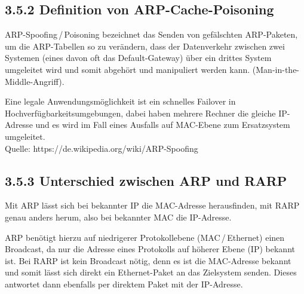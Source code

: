 \documentclass[a4paper,
			llpt,
			solution,
			accentcolor=tud2d,
			colorbacktitle
			]
			{tudexercise}
\newcommand{\8}{$\infty$}
\begin{document}
\subsection{3.5.2 Definition von ARP-Cache-Poisoning}
ARP-Spoofing\,/\,Poisoning bezeichnet das Senden von gefälschten ARP-Paketen, um die ARP-Tabellen so zu verändern, dass der Datenverkehr zwischen zwei Systemen (eines davon oft das Default-Gateway) über ein drittes System umgeleitet wird und somit abgehört und manipuliert werden kann. (Man-in-the-Middle-Angriff).

Eine legale Anwendungsmöglichkeit ist ein schnelles Failover in Hochverfügbarkeitsumgebungen, dabei haben mehrere Rechner die gleiche IP-Adresse und es wird im Fall eines Ausfalls auf MAC-Ebene zum Ersatzsystem umgeleitet.
\\
Quelle: https://de.wikipedia.org/wiki/ARP-Spoofing


\subsection{3.5.3 Unterschied zwischen ARP und RARP}

Mit ARP lässt sich bei bekannter IP die MAC-Adresse herausfinden, mit RARP genau anders herum, also bei bekannter MAC die IP-Adresse.

ARP benötigt hierzu auf niedrigerer Protokollebene (MAC\,/\,Ethernet) einen
Broadcast, da nur die Adresse eines Protokolls auf höherer Ebene (IP) bekannt ist. Bei RARP ist kein Broadcast nötig, denn es ist die MAC-Adresse bekannt und somit lässt sich direkt ein Ethernet-Paket an das Zielsystem senden. Dieses antwortet dann ebenfalls per direktem Paket mit der IP-Adresse.
\end{document}
